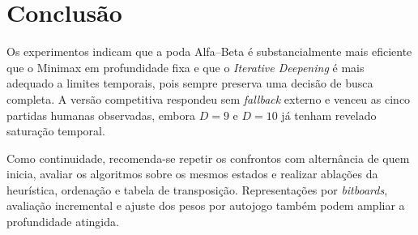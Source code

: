\documentclass[letterpaper]{article} %
\begin{document}
\section{Conclusão}

Os experimentos indicam que a poda Alfa--Beta é substancialmente mais eficiente que o Minimax em profundidade fixa e que o \textit{Iterative Deepening} é mais adequado a limites temporais, pois sempre preserva uma decisão de busca completa. A versão competitiva respondeu sem \textit{fallback} externo e venceu as cinco partidas humanas observadas, embora $D=9$ e $D=10$ já tenham revelado saturação temporal.

Como continuidade, recomenda-se repetir os confrontos com alternância de quem inicia, avaliar os algoritmos sobre os mesmos estados e realizar ablações da heurística, ordenação e tabela de transposição. Representações por \textit{bitboards}, avaliação incremental e ajuste dos pesos por autojogo também podem ampliar a profundidade atingida.
\end{document}
